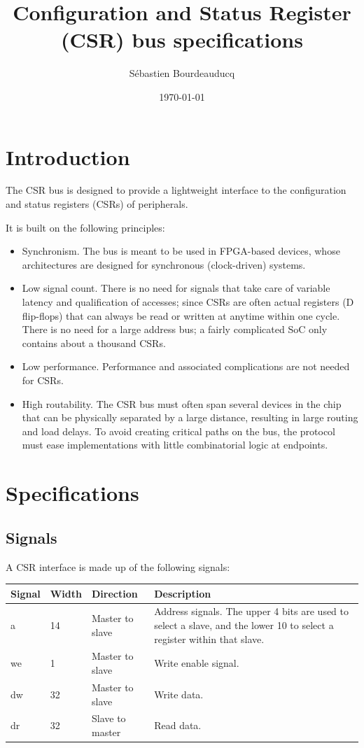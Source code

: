 \documentclass[a4paper,11pt]{article}
\title{Configuration and Status Register (CSR) bus specifications}
\author{S\'ebastien Bourdeauducq}
\date{\today}
\begin{document}
\setlength{\parindent}{0pt}
\setlength{\parskip}{5pt}
\maketitle{}
\section{Introduction}
The CSR bus is designed to provide a lightweight interface to the configuration and status registers (CSRs) of peripherals.

It is built on the following principles:
\begin{itemize}
\item Synchronism. The bus is meant to be used in FPGA-based devices, whose architectures are designed for synchronous (clock-driven) systems.
\item Low signal count. There is no need for signals that take care of variable latency and qualification of accesses; since CSRs are often actual registers (D flip-flops) that can always be read or written at anytime within one cycle. There is no need for a large address bus; a fairly complicated SoC only contains about a thousand CSRs.
\item Low performance. Performance and associated complications are not needed for CSRs.
\item High routability. The CSR bus must often span several devices in the chip that can be physically separated by a large distance, resulting in large routing and load delays. To avoid creating critical paths on the bus, the protocol must ease implementations with little combinatorial logic at endpoints.
\end{itemize}

\section{Specifications}
\subsection{Signals}
A CSR interface is made up of the following signals:

\begin{tabularx}{\textwidth}{|l|l|l|X|}
\hline
\bf{Signal} & \bf{Width} & \bf{Direction} & \bf{Description} \\
\hline
a & 14 & Master to slave & Address signals. The upper 4 bits are used to select a slave, and the lower 10 to select a register within that slave. \\
\hline
we & 1 & Master to slave & Write enable signal. \\
\hline
dw & 32 & Master to slave & Write data. \\
\hline
dr & 32 & Slave to master & Read data. \\
\hline
\end{tabularx}\\
\end{document}
